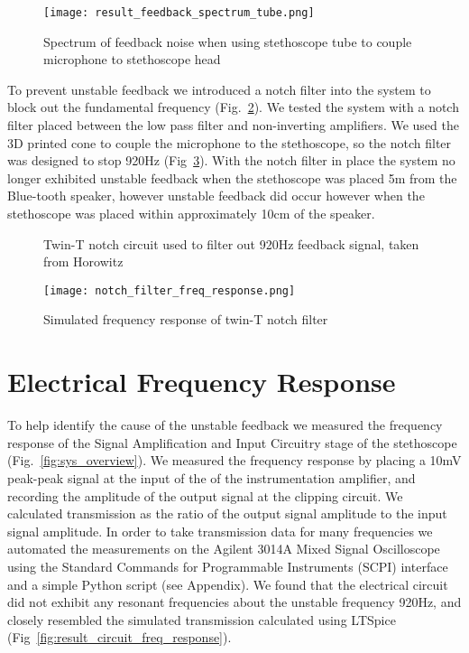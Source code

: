 \begin{figure}[!tbh]
	\centering
		\texttt{[image: result\_feedback\_spectrum\_tube.png]}
	\caption{Spectrum of feedback noise when using stethoscope tube to couple microphone to stethoscope head}
	\label{fig:feedback_tube}
\end{figure}

To prevent unstable feedback we introduced a notch filter into the system to block out the fundamental frequency (Fig.~\ref{fig:notch_circuit}). We tested the system with a notch filter placed between the low pass filter and non-inverting amplifiers. We used the 3D printed cone to couple the microphone to the stethoscope, so the notch filter was designed to stop 920Hz (Fig~\ref{fig:notch_sim}). With the notch filter in place the system no longer exhibited unstable feedback when the stethoscope was placed 5m from the Blue-tooth speaker, however unstable feedback did occur however when the stethoscope was placed within approximately 10cm of the speaker. 

\begin{figure}[!tbh]
	\centering
	\caption{Twin-T notch circuit used to filter out 920Hz feedback signal, taken from Horowitz\cite[p.~279]{Horowitz1989}}
	\label{fig:notch_circuit}
\end{figure}

\begin{figure}[!htb]
	\centering
		\texttt{[image: notch\_filter\_freq\_response.png]}
	\caption{Simulated frequency response of twin-T notch filter}
	\label{fig:notch_sim}
\end{figure}


\section{Electrical Frequency Response}
To help identify the cause of the unstable feedback we measured the frequency response of the Signal Amplification and Input Circuitry stage of the stethoscope (Fig.~\ref{fig:sys_overview}). We measured the frequency response by placing a 10mV peak-peak signal at the input of the of the instrumentation amplifier, and recording the amplitude of the output signal at the clipping circuit. We calculated transmission as the ratio of the output signal amplitude to the input signal amplitude. In order to take transmission data for many frequencies we automated the measurements on the Agilent 3014A Mixed Signal Oscilloscope using the Standard Commands for Programmable Instruments (SCPI) interface and a simple Python script (see Appendix). We found that the electrical circuit did not exhibit any resonant frequencies about the unstable frequency 920Hz, and closely resembled the simulated transmission calculated using LTSpice (Fig~\ref{fig:result_circuit_freq_response}).

